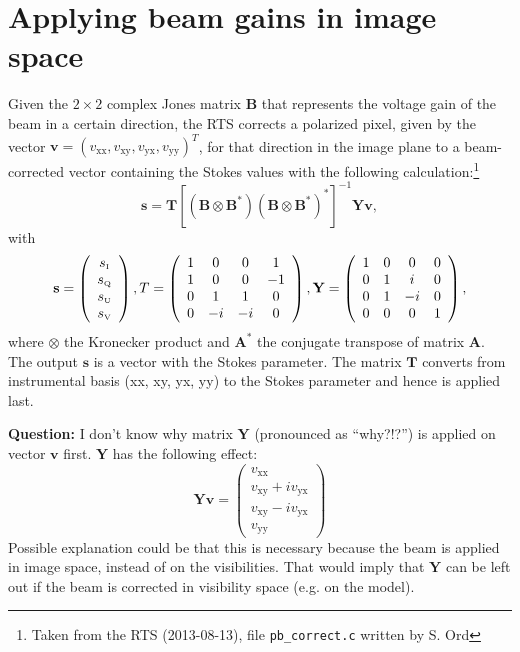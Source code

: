 \documentclass[a4paper,11pt]{article}
\begin{document}
\section{Applying beam gains in image space}
Given the $2\times 2$ complex Jones matrix $\mathbf{B}$ that represents the voltage gain of the beam in a certain direction, the RTS corrects a polarized pixel, given by the vector $\textbf{v} = \left(v_\textrm{xx}, v_\textrm{xy}, v_\textrm{yx}, v_\textrm{yy} \right)^T$, for that direction in the image plane to a beam-corrected vector containing the Stokes values with the following calculation:\footnote{Taken from the RTS (2013-08-13), file \texttt{pb\_correct.c} written by S. Ord}
\begin{equation} \label{apply-beam-image-space}
 \textbf{s} =
\mathbf{T} \left[ \left(\mathbf{B} \otimes \mathbf{B}^* \right) \left(\mathbf{B} \otimes \mathbf{B}^* \right)^*\right]^{-1} \mathbf{Y} \textbf{v},
\end{equation}
with
\begin{equation}
\textbf{s} = \left( \begin{array}{c}
s_\textrm{\tiny{I}} \\
s_\textrm{\tiny{Q}} \\
s_\textrm{\tiny{U}} \\
s_\textrm{\tiny{V}} \end{array} \right),
T = \left( \begin{array}{cccc}
1 & 0 & 0 & 1 \\
1 & 0 & 0 & -1 \\
0 & 1 & 1 & 0 \\
0 & -i & -i & 0 \end{array} \right), \mathbf{Y} = \left( \begin{array}{cccc}
1 & 0 & 0 & 0 \\
0 & 1 & i & 0 \\
0 & 1 & -i & 0 \\
0 & 0 & 0 & 1
\end{array} \right),
\end{equation}
where $\otimes$ the Kronecker product and $\mathbf{A}^*$ the conjugate transpose of matrix $\mathbf{A}$. The output $\textbf{s}$ is a vector with the Stokes parameter. The matrix $\mathbf{T}$ converts from instrumental basis (xx, xy, yx, yy) to the Stokes parameter and hence is applied last.

\textbf{Question:} I don't know why matrix $\mathbf{Y}$ (pronounced as ``why?!?'') is applied on vector $\textbf{v}$ first. $\mathbf{Y}$ has the following effect:
\begin{equation}
\mathbf{Y}\textbf{v} = \left( \begin{array}{c}
 v_\textrm{xx} \\ v_\textrm{xy} + i v_\textrm{yx} \\
 v_\textrm{xy} - i v_\textrm{yx} \\ v_\textrm{yy} \end{array}\right)
\end{equation}
Possible explanation could be that this is necessary because the beam is applied in image space, instead of on the visibilities. That would imply that $\mathbf{Y}$ can be left out if the beam is corrected in visibility space (e.g. on the model).
\end{document}
